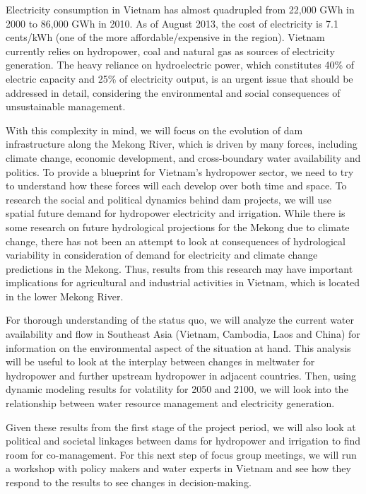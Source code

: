 \documentclass[11pt,english]{article}
\theoremstyle{plain} \newtheorem{claim}{Claim}
\theoremstyle{plain} \newtheorem{prop}{Proposition}
\theoremstyle{plain} \newtheorem{hypo}{Hypothesis}
\begin{document}
	Electricity consumption in Vietnam has almost quadrupled from 22,000 GWh in 2000 to 86,000 GWh in 2010. As of August 2013, the cost of electricity is 7.1 cents/kWh (one of the more affordable/expensive in the region). Vietnam currently relies on hydropower, coal and natural gas as sources of electricity generation. The heavy reliance on hydroelectric power, which constitutes 40\% of electric capacity and 25\% of electricity output, is an urgent issue that should be addressed in detail, considering the environmental and social consequences of unsustainable management. 

	With this complexity in mind, we will focus on the evolution of dam infrastructure along the Mekong River, which is driven by many forces, including climate change, economic development, and cross-boundary water availability and politics. To provide a blueprint for Vietnam's hydropower sector, we need to try to understand how these forces will each develop over both time and space. To research the social and political dynamics behind dam projects, we will use spatial future demand for hydropower electricity and irrigation. While there is some research on future hydrological projections for the Mekong due to climate change, there has not been an attempt to look at consequences of hydrological variability in consideration of demand for electricity and climate change predictions in the Mekong. Thus, results from this research may have important implications for agricultural and industrial activities in Vietnam, which is located in the lower Mekong River. 
	
	For thorough understanding of the status quo, we will analyze the current water availability and flow in Southeast Asia (Vietnam, Cambodia, Laos and China) for information on the environmental aspect of the situation at hand. This analysis will be useful to look at the interplay between changes in meltwater for hydropower and further upstream hydropower in adjacent countries. Then, using dynamic modeling results for volatility for 2050 and 2100, we will look into the relationship between water resource management and electricity generation. 

	Given these results from the first stage of the project period, we will also look at political and societal linkages between dams for hydropower and irrigation to find room for co-management. For this next step of focus group meetings, we will run a workshop with policy makers and water experts in Vietnam and see how they respond to the results to see changes in decision-making. 
	
\end{document}
